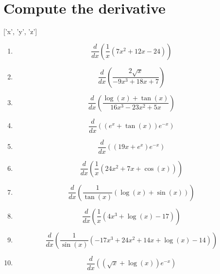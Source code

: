 \documentclass{article}
\begin{document}
        \section{Compute the derivative}
        ['x', 'y', 'z']
        \begin{multicols}{1}
        \begin{enumerate}
        \item $$\frac{d}{d x}\left(\frac{1}{x} \left(7 x^{2} + 12 x - 24\right)\right)$$
\item $$\frac{d}{d x}\left(\frac{2 \sqrt{x}}{- 9 x^{3} + 18 x + 7}\right)$$
\item $$\frac{d}{d x}\left(\frac{\log{\left (x \right )} + \tan{\left (x \right )}}{16 x^{3} - 23 x^{2} + 5 x}\right)$$
\item $$\frac{d}{d x}\left(\left(e^{x} + \tan{\left (x \right )}\right) e^{- x}\right)$$
\item $$\frac{d}{d x}\left(\left(19 x + e^{x}\right) e^{- x}\right)$$
\item $$\frac{d}{d x}\left(\frac{1}{x} \left(24 x^{2} + 7 x + \cos{\left (x \right )}\right)\right)$$
\item $$\frac{d}{d x}\left(\frac{1}{\tan{\left (x \right )}} \left(\log{\left (x \right )} + \sin{\left (x \right )}\right)\right)$$
\item $$\frac{d}{d x}\left(\frac{1}{x} \left(4 x^{3} + \log{\left (x \right )} - 17\right)\right)$$
\item $$\frac{d}{d x}\left(\frac{1}{\sin{\left (x \right )}} \left(- 17 x^{3} + 24 x^{2} + 14 x + \log{\left (x \right )} - 14\right)\right)$$
\item $$\frac{d}{d x}\left(\left(\sqrt{x} + \log{\left (x \right )}\right) e^{- x}\right)$$
        \end{enumerate}
        \end{multicols}
        

    
\end{document}
